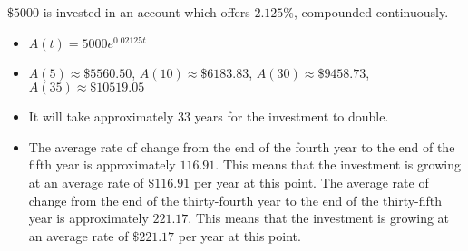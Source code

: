 {$\$5000$ is invested in an account which offers $2.125 \%$, compounded continuously. \label{basicinterestexlast}}
{\begin{itemize}  \item $A(t) = 5000e^{0.02125t}$ 

\item $A(5) \approx \$ 5560.50$, $A(10) \approx \$ 6183.83$, $A(30) \approx \$ 9458.73$, $A(35) \approx \$ 10519.05$ 

\item  It will take approximately $33$ years for the investment to double.

\item  The average rate of change from the end of the fourth year to the end of the fifth year is approximately $116.91$.  This means that the investment is growing at an average rate of $\$116.91$ per year at this point.  The average rate of change from the end of the thirty-fourth year to the end of the thirty-fifth year is approximately $221.17$.  This means that the investment is growing at an average rate of $\$221.17$ per year at this point. 

\end{itemize}}